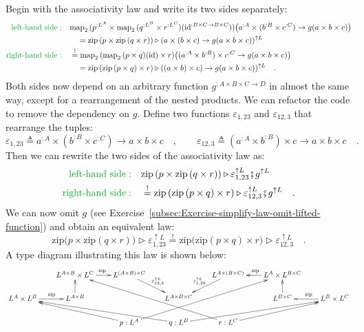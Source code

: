 Begin with the associativity law and write its two sides separately:
\begin{align*}
{\color{greenunder}\text{left-hand side}:}\quad & \text{map}_{2}\,(p^{:L^{A}}\times\text{map}_{2}\,(q^{:L^{B}}\times r^{:L^{C}})(\text{id}^{:B\times C\rightarrow B\times C}))\big(a^{:A}\times(b^{:B}\times c^{:C})\rightarrow g(a\times b\times c)\big)\\
 & \quad=\text{zip}\,(p\times\text{zip}\,(q\times r))\triangleright(a\times(b\times c)\rightarrow g(a\times b\times c))^{\uparrow L}\\
{\color{greenunder}\text{right-hand side}:}\quad & \overset{!}{=}\text{map}_{2}\,(\text{map}_{2}\,(p\times q)(\text{id})\times r)\big((a^{:A}\times b^{:B})\times c^{:C}\rightarrow g(a\times b\times c)\big)\\
 & \quad=\text{zip}\,(\text{zip}\,(p\times q)\times r)\triangleright((a\times b)\times c)\rightarrow g(a\times b\times c))^{\uparrow L}\quad.
\end{align*}
Both sides now depend on an arbitrary function $g^{:A\times B\times C\rightarrow D}$
in almost the same way, except for a rearrangement of the nested products.
We can refactor the code to remove the dependency on $g$. Define
two functions $\varepsilon_{1,23}$ and $\varepsilon_{12,3}$ that
rearrange the tuples:
\[
\varepsilon_{1,23}\triangleq a^{:A}\times(b^{:B}\times c^{:C})\rightarrow a\times b\times c\quad,\quad\quad\varepsilon_{12,3}\triangleq(a^{:A}\times b^{:B})\times c\rightarrow a\times b\times c\quad.
\]
Then we can rewrite the two sides of the associativity law as:
\begin{align*}
{\color{greenunder}\text{left-hand side}:}\quad & \text{zip}\,(p\times\text{zip}\,(q\times r))\triangleright\varepsilon_{1,23}^{\uparrow L}\bef g^{\uparrow L}\\
{\color{greenunder}\text{right-hand side}:}\quad & \overset{!}{=}\text{zip}\,(\text{zip}\,(p\times q)\times r)\triangleright\varepsilon_{12,3}^{\uparrow L}\bef g^{\uparrow L}\quad.
\end{align*}
We can now omit $g$ (see Exercise~\ref{subsec:Exercise-simplify-law-omit-lifted-function})
and obtain an equivalent law:
\begin{equation}
\text{zip}\big(p\times\text{zip}\left(q\times r\right)\big)\triangleright\varepsilon_{1,23}^{\uparrow L}\overset{!}{=}\text{zip}\big(\text{zip}\left(p\times q\right)\times r\big)\triangleright\varepsilon_{12,3}^{\uparrow L}\quad.\label{eq:zip-associativity-law-with-epsilons}
\end{equation}
A type diagram illustrating this law is shown below:
\[
\xymatrix{\xyScaleY{1.4pc}\xyScaleX{1.7pc} & L^{A\times B}\times L^{C}\ar[r]\sp(0.5){\text{zip}} & L^{(A\times B)\times C}\ar[rd]\sp(0.5){\varepsilon_{12,3}^{\uparrow L}} &  & L^{A\times(B\times C)}\ar[ld]\sb(0.5){\varepsilon_{1,23}^{\uparrow L}} & L^{A}\times L^{B\times C}\ar[l]\sb(0.5){\text{zip}}\\
L^{A}\times L^{B}\ar[r]\sp(0.55){\text{zip}} & L^{A\times B}\ar[u] &  & L^{A\times B\times C} &  & L^{B\times C}\ar[u] & L^{B}\times L^{C}\ar[l]\sb(0.5){\text{zip}}\\
 &  & p:L^{A}\ar[llu]\ar[rrruu] & q:L^{B}\ar[lllu]\ar[rrru] & r:L^{C}\ar[rru]\ar[llluu]
}
\]

